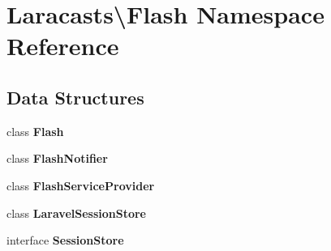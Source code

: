 \section{Laracasts\textbackslash{}Flash Namespace Reference}
\label{namespace_laracasts_1_1_flash}
\subsection*{Data Structures}
\begin{DoxyCompactItemize}
\item 
class {\bf Flash}
\item 
class {\bf Flash\+Notifier}
\item 
class {\bf Flash\+Service\+Provider}
\item 
class {\bf Laravel\+Session\+Store}
\item 
interface {\bf Session\+Store}
\end{DoxyCompactItemize}
